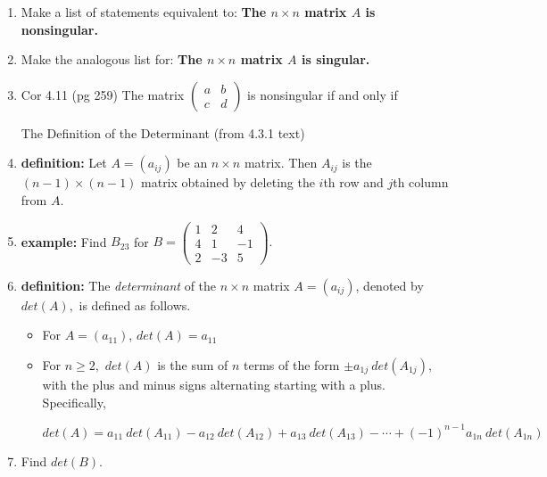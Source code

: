 \documentclass[11pt,fleqn]{article}
\begin{document}
\renewcommand{\headrulewidth}{0pt}
\newcommand{\blank}[1]{\rule{#1}{0.75pt}}
\renewcommand{\d}{\displaystyle}

\newcommand{\bpm}{\begin{pmatrix}}
\newcommand{\epm}{\end{pmatrix}}
\newcommand{\bbm}{\begin{bmatrix}}
\newcommand{\ebm}{\end{bmatrix}}

\vspace*{-0.7in}

\begin{center}
  \large {} \end{center}
 \begin{enumerate}
 \item Make a list of statements equivalent to: \textbf{The $n \times n$ matrix $A$ is nonsingular.} 
 \vfill
 \item Make the analogous list for: \textbf{The $n \times n$ matrix $A$ is singular.}
 \vfill
 \item Cor 4.11 (pg 259) The matrix $\bpm a&b\\c&d \epm$ is nonsingular if and only if
 \vspace{0.5in}
 \newpage
 \begin{center} The Definition of the Determinant (from 4.3.1 text)\end{center}
 \item \textbf{definition:} Let $A=(a_{ij})$ be an $n \times n$ matrix. Then $A_{ij}$ is the $(n-1) \times (n-1)$ matrix obtained by deleting the $i$th row and $j$th column from $A.$\\
 \item \textbf{example:} Find $B_{23}$ for $B=\bpm 1&2&4\\4&1&-1\\2&-3&5 \epm.$
 \vspace{0.7in}
  \item \textbf{definition:} The \emph{determinant} of the $n \times n$ matrix $A=(a_{ij})$, denoted by $det(A),$ is defined as follows.
  \begin{itemize}
  \item For $A=(a_{11})$, $det(A)=a_{11}$
  \item For $n\geq2,$ $det(A)$ is the sum of $n$ terms of the form $\pm a_{1j}\: det(A_{1j}),$ with the plus and minus signs alternating starting with a plus. Specifically,
  
  $$det(A)=a_{11}\: det(A_{11})-a_{12}\: det(A_{12})+a_{13}\: det(A_{13})-\cdots+ (-1)^{n-1}a_{1n}\: det(A_{1n})$$
  \end{itemize}
  \item Find $det(B).$
 \end{enumerate}
  
\end{document}
